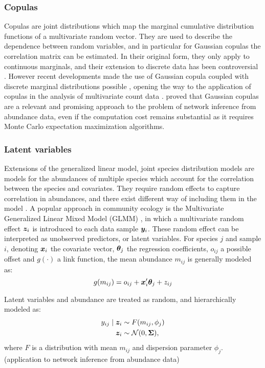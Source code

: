 \subsubsection{Copulas}
Copulas are  joint  distributions which map the marginal  cumulative distribution functions of a multivariate random vector.  They are used to describe the dependence between random variables, and in particular for Gaussian copulas the correlation matrix can be estimated. In their original form, they only apply to continuous marginals, and their extension to discrete data has been controversial \citep{F17}. However recent developments made the use of  Gaussian copula coupled with discrete marginal distributions possible \citep{PCJ12,PHW18}, opening the way to the application of copulas in the analysis of multivariate count data \citep{AVP19}. \citet{PWT19} proved that  Gaussian copulas are a relevant and promising approach to the problem of network inference from abundance data, even if the computation cost remains substantial as it requires  Monte Carlo expectation maximization algorithms.

\subsubsection{Latent variables}
Extensions of the generalized linear model, joint species distribution models  are models for the abundances of multiple species which account for the correlation between the species and  covariates. They require random effects to capture correlation in abundances, and there exist different way of including them in the model \citep{WBO15}. A popular approach in community ecology is the Multivariate Generalized Linear Mixed Model (GLMM) \citep{OHS10, PTM14}, in which a multivariate random effect ${\boldsymbol{z}}_i$ is introduced to each data sample ${\boldsymbol{y}}_i$. These random effect can be interpreted as unobserved predictors, or latent variables. For species $j$ and sample $i$, denoting ${\boldsymbol{x}}_i$ the covariate vector, ${\boldsymbol{\theta}}_j$ the  regression coefficients, $o_{ij}$ a possible offset  and $g(\cdot)$ a link function, the mean abundance $m_{ij}$  is generally modeled as:
$$g(m_{ij}) = o_{ij}+{\boldsymbol{x}}_i ' {\boldsymbol{\theta}}_j + z_{ij}$$
 
 Latent variables and abundance are treated as random, and hierarchically modeled as:
 \begin{align*}
 y_{ij}\mid {\boldsymbol{z}}_i &\sim F(m_{ij}, \phi_j)\\
 {\boldsymbol{z}}_i &\sim \mathcal{N}(0, {\boldsymbol{\Sigma}}),
 \end{align*} 
 where $F$ is a distribution with mean $m_{ij}$ and dispersion parameter $\phi_j$.
 \citep{OTN17}  \citep{OAP16, FR12} (application to network inference from abundance data)
 
